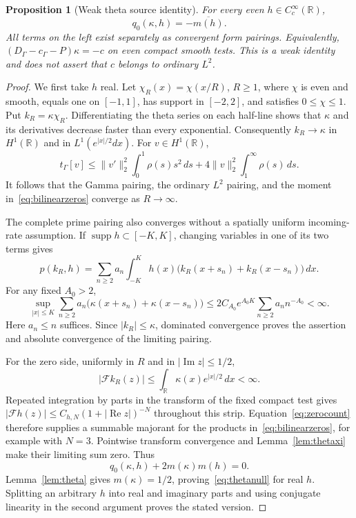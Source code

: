 \documentclass[11pt,a4paper]{article}
\numberwithin{equation}{section}
\newtheorem{proposition}[theorem]{Proposition}
\theoremstyle{definition}
\theoremstyle{remark}
\newcommand{\R}{\mathbb R}
\newcommand{\tg}{t_{\Gamma}}
\newcommand{\cg}{c_{\Gamma}}
\newcommand{\supp}{\operatorname{supp}}
\newcommand{\norm}[1]{\lVert #1\rVert}
\begin{document}
\begin{proposition}[Weak theta source identity]\label{prop:thetanull}
For every even $h\in C_c^\infty(\R)$,
\begin{equation}\label{eq:thetanull}
 q_0(\kappa,h)=-\overline{m(h)}.
\end{equation}
All terms on the left exist separately as convergent form pairings. Equivalently, $(D_\Gamma-\cg-P)\kappa=-c$ on even compact smooth tests. This is a weak identity and does not assert that $c$ belongs to ordinary $L^2$.
\end{proposition}
\begin{proof}
We first take $h$ real. Let $\chi_R(x)=\chi(x/R)$, $R\ge1$, where $\chi$ is even and smooth, equals one on $[-1,1]$, has support in $[-2,2]$, and satisfies $0\le\chi\le1$. Put $k_R=\kappa\chi_R$. Differentiating the theta series on each half-line shows that $\kappa$ and its derivatives decrease faster than every exponential. Consequently $k_R\to\kappa$ in $H^1(\R)$ and in $L^1(e^{|x|/2}dx)$. For $v\in H^1(\R)$,
\[
 \tg[v]\le\norm{v'}_2^2\int_0^1\rho(s)s^2\,ds
              +4\norm{v}_2^2\int_1^\infty\rho(s)\,ds.
\]
It follows that the Gamma pairing, the ordinary $L^2$ pairing, and the moment in~\eqref{eq:bilinearzeros} converge as $R\to\infty$.

The complete prime pairing also converges without a spatially uniform incoming-rate assumption. If $\supp h\subset[-K,K]$, changing variables in one of its two terms gives
\[
 p(k_R,h)=\sum_{n\ge2}a_n\int_{-K}^K h(x)
           \bigl(k_R(x+s_n)+k_R(x-s_n)\bigr)\,dx.
\]
For any fixed $A_0>2$,
\begin{equation}\label{eq:bridgeprimerate}
 \sup_{|x|\le K}\sum_{n\ge2}a_n
       \bigl(\kappa(x+s_n)+\kappa(x-s_n)\bigr)
 \le2C_{A_0}e^{A_0K}\sum_{n\ge2}a_nn^{-A_0}<\infty.
\end{equation}
Here $a_n\le n$ suffices. Since $|k_R|\le\kappa$, dominated convergence proves the assertion and absolute convergence of the limiting pairing.

For the zero side, uniformly in $R$ and in $|\operatorname{Im}z|\le1/2$,
\[
 |\mathcal Fk_R(z)|\le\int_\R\kappa(x)e^{|x|/2}\,dx<\infty.
\]
Repeated integration by parts in the transform of the fixed compact test gives
$|\mathcal Fh(z)|\le C_{h,N}(1+|\operatorname{Re}z|)^{-N}$ throughout this strip. Equation~\eqref{eq:zerocount} therefore supplies a summable majorant for the products in~\eqref{eq:bilinearzeros}, for example with $N=3$. Pointwise transform convergence and Lemma~\ref{lem:thetaxi} make their limiting sum zero. Thus
\[
 q_0(\kappa,h)+2m(\kappa)m(h)=0.
\]
Lemma~\ref{lem:theta} gives $m(\kappa)=1/2$, proving~\eqref{eq:thetanull} for real $h$. Splitting an arbitrary $h$ into real and imaginary parts and using conjugate linearity in the second argument proves the stated version.
\end{proof}
\end{document}
